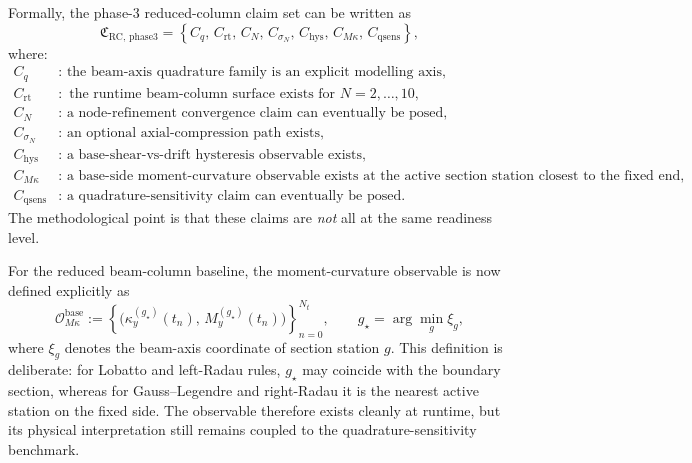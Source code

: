 Formally, the phase-3 reduced-column claim set can be written as
\begin{equation}
  \mathfrak{C}_{\text{RC},\,\mathrm{phase3}}
  =
  \left\{
    C_q,\,
    C_{\mathrm{rt}},\,
    C_{N},\,
    C_{\sigma_N},\,
    C_{\mathrm{hys}},\,
    C_{M\kappa},\,
    C_{\mathrm{qsens}}
  \right\},
\end{equation}
where:
\begin{align}
  C_q &:\text{ the beam-axis quadrature family is an explicit modelling axis,}
  \\
  C_{\mathrm{rt}} &:\text{ the runtime beam-column surface exists for } N=2,\dots,10,
  \\
  C_N &:\text{ a node-refinement convergence claim can eventually be posed,}
  \\
  C_{\sigma_N} &:\text{ an optional axial-compression path exists,}
  \\
  C_{\mathrm{hys}} &:\text{ a base-shear-vs-drift hysteresis observable exists,}
  \\
  C_{M\kappa} &:\text{ a base-side moment-curvature observable exists at the active}
                 \text{ section station closest to the fixed end,}
  \\
  C_{\mathrm{qsens}} &:\text{ a quadrature-sensitivity claim can eventually be posed.}
\end{align}
The methodological point is that these claims are \emph{not} all at the same
readiness level.

For the reduced beam-column baseline, the moment-curvature observable is now
defined explicitly as
\begin{equation}
  \mathcal{O}_{M\kappa}^{\mathrm{base}}
  :=
  \left\{
    \bigl(\kappa_y^{(g_\star)}(t_n),\,M_y^{(g_\star)}(t_n)\bigr)
  \right\}_{n=0}^{N_t},
  \qquad
  g_\star = \arg\min_g \xi_g,
\end{equation}
where \(\xi_g\) denotes the beam-axis coordinate of section station \(g\).
This definition is deliberate: for Lobatto and left-Radau rules,
\(g_\star\) may coincide with the boundary section, whereas for
Gauss--Legendre and right-Radau it is the nearest active station on the fixed
side.  The observable therefore exists cleanly at runtime, but its physical
interpretation still remains coupled to the quadrature-sensitivity benchmark.

